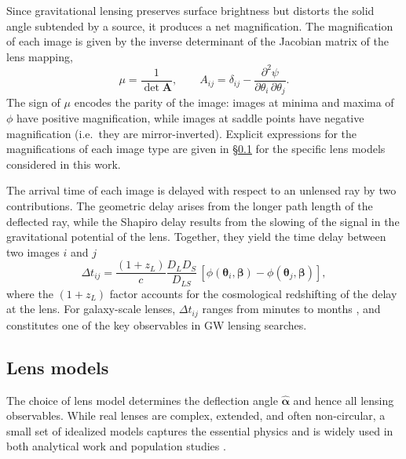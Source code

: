 Since gravitational lensing preserves surface brightness but 
distorts the solid angle subtended by a source, it produces a net magnification. The magnification of each image is given by the inverse determinant of the Jacobian matrix of the lens mapping,
\begin{equation}
    \mu = \frac{1}{\det \mathbf{A}}, \qquad 
    A_{ij} = \delta_{ij} - 
    \frac{\partial^2 \psi}{\partial\theta_i\,\partial\theta_j}.
    \label{eq:magnification}
\end{equation}
The sign of $\mu$ encodes the parity of the image: images at 
minima and maxima of $\phi$ have positive magnification, while images at saddle points have negative magnification (i.e.\ they are mirror-inverted). Explicit expressions for the magnifications of each image type are given in \S\ref{sec:lens_models} for the specific lens models considered in this work.

The arrival time of each image is delayed with respect to an 
unlensed ray by two contributions. The geometric delay arises from the longer path length of the deflected ray, while the Shapiro delay \cite{Shapiro1964, shapiro_delay} results from the slowing of the signal in the gravitational potential of the lens. Together, they yield the time delay between two images $i$ and $j$
\begin{equation}
    \Delta t_{ij} = \frac{(1+z_L)}{c}
    \frac{D_L D_S}{D_{LS}}\,
    \left[\phi(\boldsymbol{\theta}_i,\boldsymbol{\beta}) -
    \phi(\boldsymbol{\theta}_j,\boldsymbol{\beta})\right],
    \label{eq:time_delay}
\end{equation}
where the $(1+z_L)$ factor accounts for the cosmological 
redshifting of the delay at the lens. For galaxy-scale lenses, $\Delta t_{ij}$ ranges from minutes to months \cite{time_delay}, and constitutes one of the key observables in GW lensing searches.



\subsection{Lens models}
\label{sec:lens_models}

The choice of lens model determines the deflection angle 
$\hat{\boldsymbol{\alpha}}$ and hence all lensing observables. While real lenses are complex, extended, and often non-circular, a small set of idealized models captures the essential physics and is widely used in both analytical work and population studies \cite{essentialsstronggravitationallensing}.

